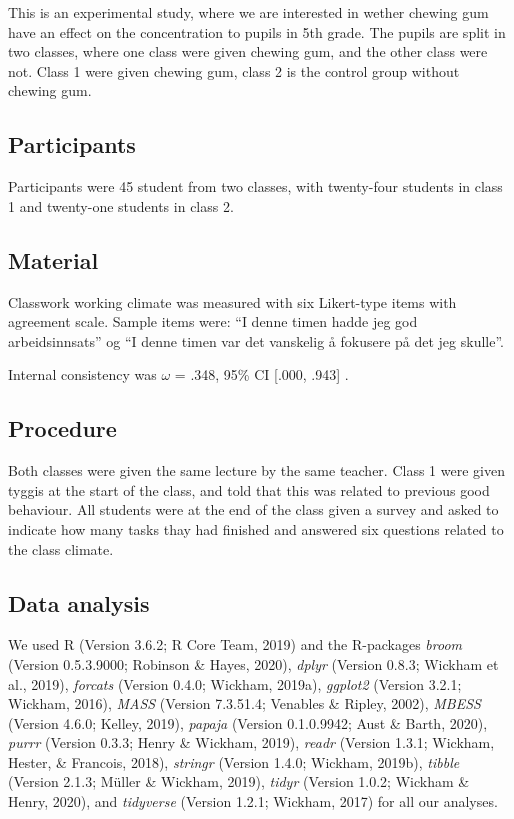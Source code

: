 \documentclass[english,jou]{apa6}
\begin{document}
This is an experimental study, where we are interested in wether chewing gum have an effect on the concentration to pupils in 5th grade.
The pupils are split in two classes, where one class were given chewing gum, and the other class were not.
Class 1 were given chewing gum, class 2 is the control group without chewing gum.

\hypertarget{participants}{%
\subsection{Participants}\label{participants}}

Participants were 45 student from two classes, with twenty-four students in class 1 and twenty-one students in class 2.

\hypertarget{material}{%
\subsection{Material}\label{material}}

Classwork working climate was measured with six Likert-type items with agreement scale.
Sample items were: \enquote{I denne timen hadde jeg god arbeidsinnsats} og \enquote{I denne timen var det vanskelig å fokusere på det jeg skulle}.

Internal consistency was \(\omega\) = .348, 95\% CI {[}.000, .943{]} .

\hypertarget{procedure}{%
\subsection{Procedure}\label{procedure}}

Both classes were given the same lecture by the same teacher.
Class 1 were given tyggis at the start of the class, and told that this was related to previous good behaviour.
All students were at the end of the class given a survey and asked to indicate how many tasks thay had finished and answered six questions related to the class climate.

\hypertarget{data-analysis}{%
\subsection{Data analysis}\label{data-analysis}}

We used R (Version 3.6.2; R Core Team, 2019) and the R-packages \emph{broom} (Version 0.5.3.9000; Robinson \& Hayes, 2020), \emph{dplyr} (Version 0.8.3; Wickham et al., 2019), \emph{forcats} (Version 0.4.0; Wickham, 2019a), \emph{ggplot2} (Version 3.2.1; Wickham, 2016), \emph{MASS} (Version 7.3.51.4; Venables \& Ripley, 2002), \emph{MBESS} (Version 4.6.0; Kelley, 2019), \emph{papaja} (Version 0.1.0.9942; Aust \& Barth, 2020), \emph{purrr} (Version 0.3.3; Henry \& Wickham, 2019), \emph{readr} (Version 1.3.1; Wickham, Hester, \& Francois, 2018), \emph{stringr} (Version 1.4.0; Wickham, 2019b), \emph{tibble} (Version 2.1.3; Müller \& Wickham, 2019), \emph{tidyr} (Version 1.0.2; Wickham \& Henry, 2020), and \emph{tidyverse} (Version 1.2.1; Wickham, 2017) for all our analyses.
\end{document}
